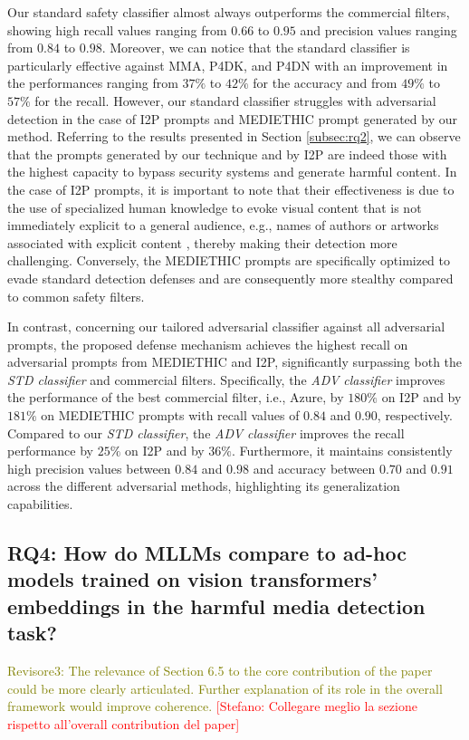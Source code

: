 \documentclass[acmsmall]{acmart}
\newcommand{\dataset}{\textsc{MEDIETHIC}\xspace}
\newcommand{\ste}[1]{\textcolor{red}{[Stefano: #1]}}
\newcommand{\revthree}[1]{\textcolor{olive}{Revisore3: #1}}
\begin{document}
{Our standard safety classifier almost always outperforms the commercial filters, showing high recall values ranging from $0.66$ to $0.95$ and precision values ranging from $0.84$ to $0.98$. Moreover, we can notice that the standard classifier is particularly effective against MMA, P4DK, and P4DN with an improvement in the performances ranging from $37\%$ to $42\%$ for the accuracy and from $49\%$ to $57\%$ for the recall.
However, our standard classifier struggles with adversarial detection in the case of I2P prompts and \dataset prompt generated by our method.
Referring to the results presented in Section \ref{subsec:rq2}, we can observe that the prompts generated by our technique and by I2P are indeed those with the highest capacity to bypass security systems and generate harmful content. In the case of I2P prompts, it is important to note that their effectiveness is due to the use of specialized human knowledge to evoke visual content that is not immediately explicit to a general audience, e.g., names of authors or artworks associated with explicit content \cite{schramowski2023safe}, thereby making their detection more challenging.
Conversely, the \dataset prompts are specifically optimized to evade standard detection defenses and are consequently more stealthy compared to common safety filters.

In contrast, concerning our tailored adversarial classifier against all adversarial prompts, the proposed defense mechanism achieves the highest recall on adversarial prompts from \dataset and I2P, significantly surpassing both the \textit{STD classifier} and commercial filters.  Specifically, the \textit{ADV classifier} improves the performance of the best commercial filter, i.e., Azure, by $180\%$ on I2P and by $181\%$ on \dataset prompts with recall values of $0.84$ and $0.90$, respectively. Compared to our \textit{STD classifier}, the \textit{ADV classifier} improves the recall performance by $25\%$ on I2P and by $36\%$. Furthermore, it maintains consistently high precision values between $0.84$ and $0.98$ and accuracy between $0.70$ and $0.91$ across the different adversarial methods, highlighting its generalization capabilities.
\vspace{-0.1cm}
\subsection{RQ4: How do MLLMs compare to ad-hoc models trained on vision transformers' embeddings in the harmful media detection task?}\label{sec:MLLMs}
\revthree{The relevance of Section 6.5 to the core contribution of the paper could be more clearly articulated. Further explanation of its role in the overall framework would improve coherence.}
\ste{Collegare meglio la sezione rispetto all'overall contribution del paper}

}
\end{document}
